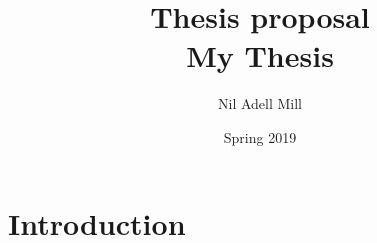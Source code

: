 \documentclass{article}
\begin{document}

\title{\vspace{-0.5cm}\LARGE Thesis proposal \vspace{0.4cm} \\\huge My Thesis}
\author{Nil Adell Mill\vspace{0.2cm}} %
\date{Spring 2019}

\maketitle


    \section*{Introduction}
    
\end{document}
